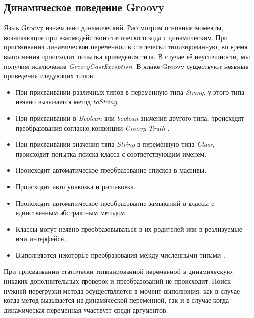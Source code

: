 \subsection{Динамическое поведение Groovy}

Язык Groovy изначально динамический. Рассмотрим основные моменты, возникающие при взаимодействии статического кода с динамическим. При присваивании динамической переменной в статически типизированную, во время выполнения происходит попытка приведения типа. В случае её неуспешности, мы получим исключение \textit{GroovyCastException}. В языке Groovy существуют неявные приведения следующих типов:

\begin{itemize}
\item При присваивании различных типов в переменную типа \textit{String}, у этого типа неявно вызывается метод \textit{toString}. 
\item При присваивании в \textit{Boolean} или \textit{boolean} значения другого типа, происходят преобразования согласно конвенции \textit{Groovy Truth} \cite{groovy:groovyTruth}.
\item При присваивании значения типа \textit{String} в переменную типа \textit{Class}, происходит попытка поиска класса с соответствующим именем. 
\item Происходит автоматическое преобразование списков в массивы.
\item Происходит авто упаковка и распаковка\footnotemark.
\item Происходит автоматическое преобразование замыканий в классы с единственным абстрактным методом.
\item Классы могут неявно преобразовываться в их родителей или в реализуемые ими интерфейсы.
\item Выполняются некоторые преобразования между численными типами \cite{groovy:semanticTypeCheckingAssignments}. 
\end{itemize}
При присваивании статически типизированной переменной в динамическую, никаких дополнительных проверок и преобразований не происходит.
Поиск нужной перегрузки метода осуществляется в момент выполнения, как в случае когда метод вызывается на динамической переменной, так и в случае когда динамическая переменная участвует среди аргументов.





